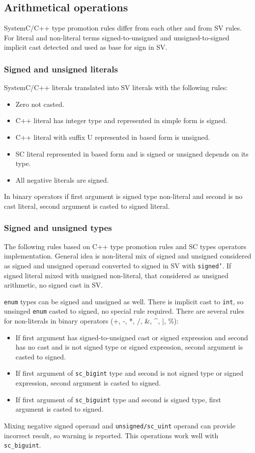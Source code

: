 \subsection{Arithmetical operations}\label{section:arithmetic_gen}

SystemC/C++ type promotion rules differ from each other and from SV rules. For literal and non-literal terms signed-to-unsigned and unsigned-to-signed implicit cast detected and used as base for sign in SV.

\subsubsection{Signed and unsigned literals}

SystemC/C++ literals translated into SV literals with the following rules:
\begin{itemize}
\item Zero not casted.
\item C++ literal has integer type and represented in simple form is signed.
\item C++ literal with suffix U represented in based form is unsigned.
\item SC literal represented in based form and is signed or unsigned depends on its type.
\item All negative literals are signed.
\end{itemize}
In binary operators if first argument is signed type non-literal and second is no cast literal, second argument is casted to signed literal.

\subsubsection{Signed and unsigned types}

The following rules based on C++ type promotion rules and SC types operators implementation.
General idea is non-literal mix of signed and unsigned considered as signed and unsigned operand converted to signed in SV with {\tt signed'}. If signed literal mixed with unsigned non-literal, that considered as unsigned arithmetic, no signed cast in SV.

{\tt enum} types can be signed and unsigned as well. There is implicit cast to {\tt int}, so unsinged {\tt enum} casted to signed, no special rule required.
There are several rules for non-literals in binary operators (+, -, *, /, \&, \textasciicircum, |, \%):
%
\begin{itemize}
\item If first argument has signed-to-unsigned cast or signed expression and second has no cast and is not signed type or signed expression, second argument is casted to signed.
\item If first argument of {\tt sc\_bigint} type and second is not signed type or signed expression, second argument is casted to signed.
\item If first argument of {\tt sc\_biguint} type and second is signed type, first argument is casted to signed.
\end{itemize}
%
Mixing negative signed operand and {\tt unsigned/sc\_uint} operand can provide incorrect result, so warning is reported. This operations work well with {\tt sc\_biguint}.

